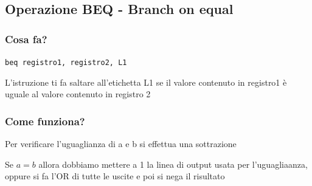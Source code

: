 \subsection{Operazione BEQ - Branch on equal}

\subsubsection{Cosa fa?}

\vspace{0.5cm}

\begin{center}
    {
        \large
        \texttt{beq registro1, registro2, L1}
    }
\end{center}

\vspace{0.5cm}

L'istruzione ti fa saltare all'etichetta L1 se il valore contenuto in registro1 è uguale al valore contenuto in registro 2

\subsubsection{Come funziona?}
Per verificare l'uguaglianza di a e b si effettua una sottrazione

Se $a=b$ allora dobbiamo mettere a 1 la linea di output usata per l'uguagliaanza, oppure si fa l'OR di tutte le uscite e poi si nega il risultato